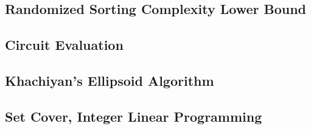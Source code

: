 \documentclass[11pt]{article}
\theoremstyle{plain}
\theoremstyle{definition}
\numberwithin{equation}{section}
\numberwithin{figure}{section}
\begin{document}
\subsection{Randomized Sorting Complexity Lower Bound}

\subsection{Circuit Evaluation}

\subsection{Khachiyan's Ellipsoid Algorithm}

\subsection{Set Cover, Integer Linear Programming}
\end{document}
